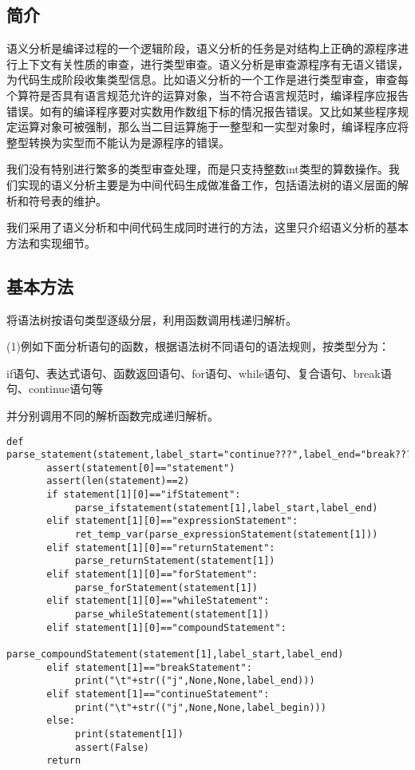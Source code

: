 \documentclass{article}
\begin{document}
\subsection{简介}

语义分析是编译过程的一个逻辑阶段，语义分析的任务是对结构上正确的源程序进行上下文有关性质的审查，进行类型审查。语义分析是审查源程序有无语义错误，为代码生成阶段收集类型信息。比如语义分析的一个工作是进行类型审查，审查每个算符是否具有语言规范允许的运算对象，当不符合语言规范时，编译程序应报告错误。如有的编译程序要对实数用作数组下标的情况报告错误。又比如某些程序规定运算对象可被强制，那么当二目运算施于一整型和一实型对象时，编译程序应将整型转换为实型而不能认为是源程序的错误。

我们没有特别进行繁多的类型审查处理，而是只支持整数int类型的算数操作。我们实现的语义分析主要是为中间代码生成做准备工作，包括语法树的语义层面的解析和符号表的维护。

我们采用了语义分析和中间代码生成同时进行的方法，这里只介绍语义分析的基本方法和实现细节。

\subsection{基本方法}

将语法树按语句类型逐级分层，利用函数调用栈递归解析。

(1)例如下面分析语句的函数，根据语法树不同语句的语法规则，按类型分为：

if语句、表达式语句、函数返回语句、for语句、while语句、复合语句、break语句、continue语句等

并分别调用不同的解析函数完成递归解析。

\begin{verbatim}
def parse_statement(statement,label_start="continue???",label_end="break???"):
       assert(statement[0]=="statement")
       assert(len(statement)==2)
       if statement[1][0]=="ifStatement":
            parse_ifstatement(statement[1],label_start,label_end)
       elif statement[1][0]=="expressionStatement":
            ret_temp_var(parse_expressionStatement(statement[1]))
       elif statement[1][0]=="returnStatement":
            parse_returnStatement(statement[1])
       elif statement[1][0]=="forStatement":
            parse_forStatement(statement[1])
       elif statement[1][0]=="whileStatement":
            parse_whileStatement(statement[1])
       elif statement[1][0]=="compoundStatement":
            parse_compoundStatement(statement[1],label_start,label_end)
       elif statement[1]=="breakStatement":
            print("\t"+str(("j",None,None,label_end)))
       elif statement[1]=="continueStatement":
            print("\t"+str(("j",None,None,label_begin)))
       else:
            print(statement[1])
            assert(False)
       return
\end{verbatim}
\end{document}

